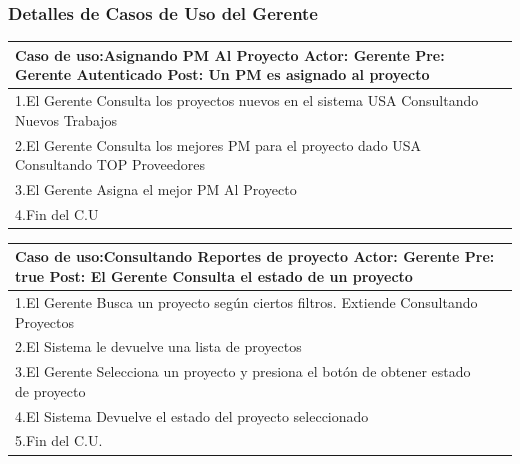 \subsubsection{Detalles de Casos de Uso del Gerente}
\begin{longtable}{|p{}|p{}|}
    \hline
    \multicolumn{2}{|p{16cm}|}{
        \textbf{Caso de uso:}Asignando PM Al Proyecto\newline
        \textbf{Actor:} Gerente\newline
        \textbf{Pre: }Gerente Autenticado\newline
        \textbf{Post:} Un PM es asignado al proyecto
    }\\
    \hline
    1.El Gerente Consulta los proyectos nuevos en el sistema USA Consultando Nuevos Trabajos&    \\
    \hline
    2.El Gerente Consulta los mejores PM para el proyecto dado USA Consultando TOP Proveedores& \\
    \hline
    3.El Gerente Asigna el mejor PM Al Proyecto&\\
    \hline
    4.Fin del C.U&\\
    \hline
\end{longtable}


\begin{longtable}{|p{}|p{}|}
    \hline
    \multicolumn{2}{|p{16cm}|}{
        \textbf{Caso de uso:}Consultando Reportes de proyecto\newline
        \textbf{Actor:} Gerente\newline
        \textbf{Pre: }true\newline
        \textbf{Post:}  El Gerente Consulta el estado de un proyecto
    }\\
    \hline
    1.El Gerente Busca un proyecto según ciertos filtros. Extiende Consultando Proyectos&    \\
    \hline
    2.El Sistema le devuelve una lista de proyectos& \\
    \hline
    3.El Gerente Selecciona un proyecto y presiona el botón de obtener estado de proyecto&\\
    \hline
    4.El Sistema Devuelve el estado del proyecto seleccionado &\\
    \hline
    5.Fin del C.U.&\\
    \hline
\end{longtable}

